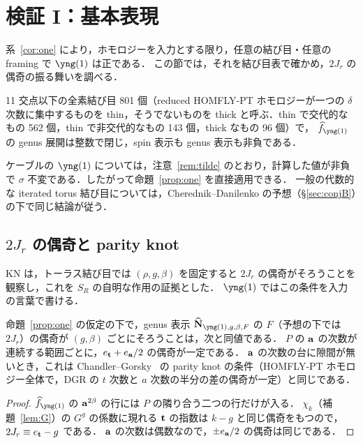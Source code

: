 \section{検証 I：基本表現}\label{sec:one}

系~\ref{cor:one} により，ホモロジーを入力とする限り，任意の結び目・任意の framing で $\yng(1)$ は正である．
この節では，それを結び目表で確かめ，$2J_r$ の偶奇の振る舞いを調べる．

\begin{compresult}\label{cr:table}
11 交点以下の全素結び目 801 個（reduced HOMFLY-PT ホモロジーが一つの $\delta$ 次数に集中するものを thin，そうでないものを thick と呼ぶ．thin で交代的なもの 562 個，thin で非交代的なもの 143 個，thick なもの 96 個）で，
$\hf_{\yng(1)}$ の genus 展開は整数で閉じ，spin 表示も genus 表示も非負である．
\end{compresult}

ケーブルの $\yng(1)$ については，注意~\ref{rem:tilde} のとおり，計算した値が非負で $\sigma$ 不変である．したがって命題~\ref{prop:one} を直接適用できる．
一般の代数的な iterated torus 結び目については，Cherednik--Danilenko の予想（\S\ref{sec:conjB}）の下で同じ結論が従う．

\subsection{$2J_r$ の偶奇と parity knot}
KN は，トーラス結び目では $(\rho,g,\beta)$ を固定すると $2J_r$ の偶奇がそろうことを観察し，これを $S_R$ の自明な作用の証拠とした．
$\yng(1)$ ではこの条件を入力の言葉で書ける．

\begin{proposition}\label{prop:parity}
命題~\ref{prop:one} の仮定の下で，genus 表示 $\hbN_{\yng(1),g,\beta,F}$ の $F$（予想の下では $2J_r$）の偶奇が $(g,\beta)$ ごとにそろうことは，次と同値である．
$P$ の $\mathbf{a}$ の次数が連続する範囲ごとに，$e_{\mathbf{t}}+e_{\mathbf{a}}/2$ の偶奇が一定である．
$\mathbf{a}$ の次数の台に隙間が無いとき，これは Chandler--Gorsky~\cite{Chandler22} の parity knot の条件（HOMFLY-PT ホモロジー全体で，DGR の $t$ 次数と $a$ 次数の半分の差の偶奇が一定）と同じである．
\end{proposition}
\begin{proof}
$\hf_{\yng(1)}$ の $\mathbf{a}^{2\beta}$ の行には $P$ の隣り合う二つの行だけが入る．
$\chi_k$（補題~\ref{lem:G}）の $G^g$ の係数に現れる $\mathbf{t}$ の指数は $k-g$ と同じ偶奇をもつので，$2J_r\equiv e_{\mathbf{t}}-g$ である．
$\mathbf{a}$ の次数は偶数なので，$\pm e_{\mathbf{a}}/2$ の偶奇は同じである．
\end{proof}


